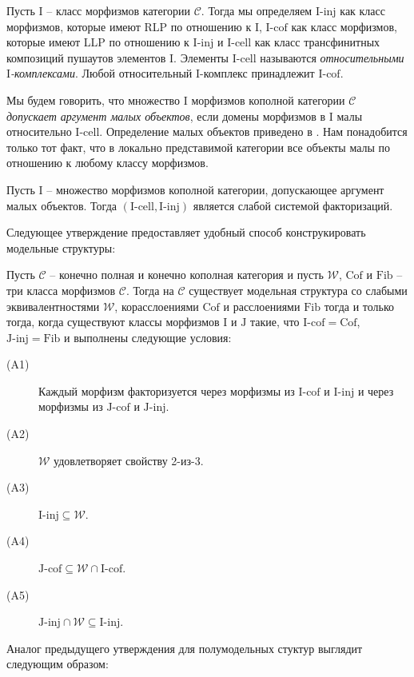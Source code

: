 \documentclass[reqno]{amsart}
\theoremstyle{definition}
\theoremstyle{remark}
\newcommand{\cat}[1]{\mathcal{#1}}
\renewcommand{\C}{\cat{C}}
\newcommand{\we}{\mathcal{W}}
\newcommand{\fib}{\mathrm{Fib}}
\newcommand{\cof}{\mathrm{Cof}}
\newcommand{\I}{\mathrm{I}}
\newcommand{\J}{\mathrm{J}}
\newcommand{\class}[2]{#1\text{-}\mathrm{#2}}
\newcommand{\Iinj}[1][\I]{\class{#1}{inj}}
\newcommand{\Icell}[1][\I]{\class{#1}{cell}}
\newcommand{\Icof}[1][\I]{\class{#1}{cof}}
\newcommand{\Jinj}[1][]{\Iinj[\J#1]}
\newcommand{\Jcof}[1][]{\Icof[\J#1]}
\begin{document}
Пусть $\I$ -- класс морфизмов категории $\C$.
Тогда мы определяем $\Iinj$ как класс морфизмов, которые имеют RLP по отношению к $\I$, $\Icof$ как класс морфизмов, которые имеют LLP по отношению к $\Iinj$ и $\Icell$ как класс трансфинитных композиций пушаутов элементов $\I$.
Элементы $\Icell$ называются \emph{относительными $\I$-комплексами}.
Любой относительный $\I$-комплекс принадлежит $\Icof$.

Мы будем говорить, что множество $\I$ морфизмов кополной категории $\C$ \emph{допускает аргумент малых объектов}, если домены морфизмов в $\I$ малы относительно $\Icell$.
Определение малых объектов приведено в \cite[Definition~2.1.3]{hovey}.
Нам понадобится только тот факт, что в локально представимой категории все объекты малы по отношению к любому классу морфизмов.

\begin{prop}
Пусть $\I$ -- множество морфизмов кополной категории, допускающее аргумент малых объектов.
Тогда $(\Icell,\Iinj)$ является слабой системой факторизаций.
\end{prop}

Следующее утверждение предоставляет удобный способ конструкировать модельные структуры:

\begin{prop}
Пусть $\C$ -- конечно полная и конечно кополная категория и пусть $\we$, $\cof$ и $\fib$ -- три класса морфизмов $\C$.
Тогда на $\C$ существует модельная структура со слабыми эквивалентностями $\we$, корасслоениями $\cof$ и расслоениями $\fib$ тогда и только тогда,
когда существуют классы морфизмов $\I$ и $\J$ такие, что $\Icof = \cof$, $\Jinj = \fib$ и выполнены следующие условия:
\begin{description}
\item[(A1)] Каждый морфизм факторизуется через морфизмы из $\Icof$ и $\Iinj$ и через морфизмы из $\Jcof$ и $\Jinj$.
\item[(A2)] $\we$ удовлетворяет свойству 2-из-3.
\item[(A3)] $\Iinj \subseteq \we$.
\item[(A4)] $\Jcof \subseteq \we \cap \Icof$.
\item[(A5)] $\Jinj \cap \we \subseteq \Iinj$.
\end{description}
\end{prop}

Аналог предыдущего утверждения для полумодельных стуктур выглядит следующим образом:
\end{document}
